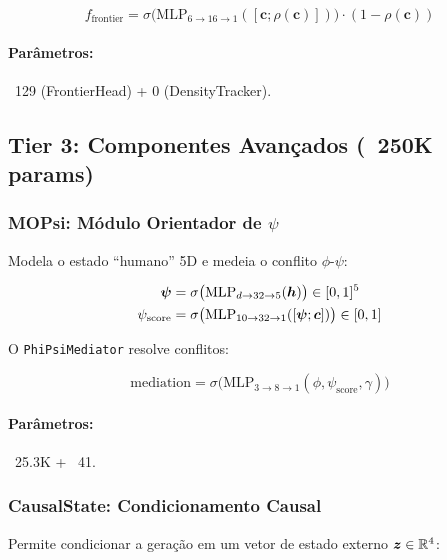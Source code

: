 \begin{equation}
    f_{\text{frontier}} = \sigma\big(\text{MLP}_{6 \to 16 \to 1}([\bm{c}; \rho(\bm{c})])\big) \cdot (1 - \rho(\bm{c}))
\end{equation}

\paragraph{Par\^ametros:} ~129 (FrontierHead) + 0 (DensityTracker).

\subsection{Tier 3: Componentes Avan\c{c}ados (~250K params)}

\subsubsection{MOPsi: M\'odulo Orientador de $\psi$}
\label{sec:mopsi}

Modela o estado ``humano'' 5D e medeia o conflito $\phi$-$\psi$:

\begin{align}
    \bm{\psi} &= \sigma\big(\text{MLP}_{d \to 32 \to 5}(\bm{h})\big) \in [0, 1]^5 \\
    \psi_{\text{score}} &= \sigma\big(\text{MLP}_{10 \to 32 \to 1}([\bm{\psi}; \bm{c}])\big) \in [0, 1]
\end{align}

O \texttt{PhiPsiMediator} resolve conflitos:

\begin{equation}
    \text{mediation} = \sigma\big(\text{MLP}_{3 \to 8 \to 1}(\phi, \psi_{\text{score}}, \gamma)\big)
\end{equation}

\paragraph{Par\^ametros:} ~25.3K + ~41.

\subsubsection{CausalState: Condicionamento Causal}
\label{sec:causal}

Permite condicionar a gera\c{c}\~ao em um vetor de estado externo
$\bm{z} \in \mathbb{R}^4$:

